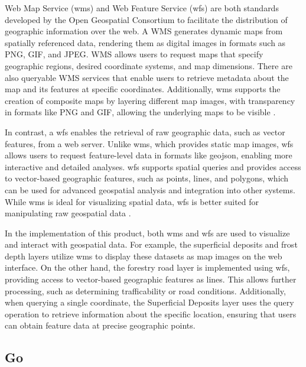 Web Map Service (\Gls{wms}) and Web Feature Service (\Gls{wfs}) are both standards developed by the Open Geospatial Consortium to facilitate the distribution of geographic information over the web. A WMS generates dynamic maps from spatially referenced data, rendering them as digital images in formats such as PNG, GIF, and JPEG. WMS allows users to request maps that specify geographic regions, desired coordinate systems, and map dimensions. There are also queryable WMS services that enable users to retrieve metadata about the map and its features at specific coordinates. Additionally, \Gls{wms} supports the creation of composite maps by layering different map images, with transparency in formats like PNG and GIF, allowing the underlying maps to be visible \cite{ogc2006wms}.

In contrast, a \Gls{wfs} enables the retrieval of raw geographic data, such as vector features, from a web server. Unlike \Gls{wms}, which provides static map images, \Gls{wfs} allows users to request feature-level data in formats like \Gls{geojson}, enabling more interactive and detailed analyses. \Gls{wfs} supports spatial queries and provides access to vector-based geographic features, such as points, lines, and polygons, which can be used for advanced geospatial analysis and integration into other systems. While \Gls{wms} is ideal for visualizing spatial data, \Gls{wfs} is better suited for manipulating raw geospatial data \cite{ogc2005wfs}.

In the implementation of this product, both \Gls{wms} and \Gls{wfs} are used to visualize and interact with geospatial data. For example, the superficial deposits and frost depth layers utilize \Gls{wms} to display these datasets as map images on the web interface. On the other hand, the forestry road layer is implemented using \Gls{wfs}, providing access to vector-based geographic features as lines. This allows further processing, such as determining \gls{trafficability} or road conditions. Additionally, when querying a single coordinate, the Superficial Deposits layer uses the query operation to retrieve information about the specific location, ensuring that users can obtain feature data at precise geographic points.

\subsection{Go}\label{subsec:implementation:technologies:go}

